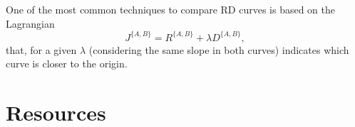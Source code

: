 One of the most common techniques to compare RD curves is based on the
Lagrangian~\cite{vetterli1995wavelets,sayood2017introduction}
\begin{equation}
  J^{\{A,B\}}=R^{\{A,B\}}+\lambda D^{\{A,B\}},
  \label{eq:lagrangian}
\end{equation}
that, for a given $\lambda$ (considering the same slope in both
curves) indicates which curve is closer to the origin.

\section{Resources}
\renewcommand{\addcontentsline}[3]{}%


